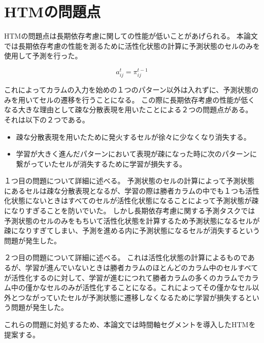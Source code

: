 \section{HTMの問題点}
HTMの問題点は長期依存考慮に関しての性能が低いことがあげられる。
本論文では長期依存考慮の性能を測るために活性化状態の計算に予測状態のセルのみを使用して予測を行った。

\begin{equation}
  a^t_{ij} = \pi^{t-1}_{ij}
\end{equation}

これによってカラムの入力を始めの１つのパターン以外は入れずに、予測状態のみを用いてセルの遷移を行うことになる。
この際に長期依存考慮の性能が低くなる大きな理由として疎な分散表現を用いたことによる２つの問題点がある。
それは以下の２つである。

\begin{itemize}
  \item 疎な分散表現を用いたために発火するセルが徐々に少なくなり消失する。
  \item 学習が大きく進んだパターンにおいて表現が疎になった時に次のパターンに繋がっていたセルが消失するために学習が損失する。
\end{itemize}

１つ目の問題について詳細に述べる。
予測状態のセルの計算によって予測状態にあるセルは疎な分散表現となるが、学習の際は勝者カラムの中でも１つも活性化状態にないときはすべてのセルが活性化状態になることによって予測状態が疎になりすぎることを防いでいた。
しかし長期依存考慮に関する予測タスクでは予測状態のセルのみをもちいて活性化状態を計算するため予測状態になるセルが疎になりすぎてしまい、予測を進める内に予測状態になるセルが消失するという問題が発生した。

２つ目の問題について詳細に述べる。
これは活性化状態の計算によるものであるが、学習が進んでいないときは勝者カラムのほとんどのカラム中のセルすべてが活性化するのに対して、学習が進むにつれて勝者カラムの多くのカラムでカラム中の僅かなセルのみが活性化することになる。これによってその僅かなセル以外とつながっていたセルが予測状態に遷移しなくなるために学習が損失するという問題が発生した。

これらの問題に対処するため、本論文では時間軸セグメントを導入したHTMを提案する。
